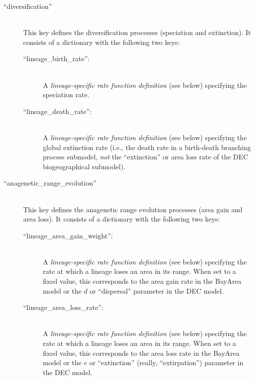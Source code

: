 \documentclass[11pt,openany]{memoir} %
\begin{document}
\begin{description}
    \item[``diversification'']  \hfill \\
        This key defines the diversification processes (speciation and extinction).
        It consists of a dictionary with the following two keys:
        \begin{description}
            \item[``lineage\_birth\_rate'':] \hfill \\
                A \textit{lineage-specific rate function definition} (see below) specifying the speciation rate.
            \item[``lineage\_death\_rate'':] \hfill \\
                A \textit{lineage-specific rate function definition} (see below) specifying the global extinction rate (i.e., the death rate in a birth-death branching process submodel, \textit{not} the ``extinction'' or area loss rate of the DEC biogeographical submodel).
        \end{description}

    \item[``anagenetic\_range\_evolution'']  \hfill \\
        This key defines the anagenetic range evolution processes (area gain and area loss).
        It consists of a dictionary with the following two keys:
        \begin{description}
            \item[``lineage\_area\_gain\_weight'':] \hfill \\
                A \textit{lineage-specific rate function definition} (see below) specifying the rate at which a lineage loses an area in its range.
                When set to a fixed value, this corresponds to the area gain rate in the BayArea model or the $d$ or ``dispersal'' parameter in the DEC model.
            \item[``lineage\_area\_loss\_rate'':] \hfill \\
                A \textit{lineage-specific rate function definition} (see below) specifying the rate at which a lineage loses an area in its range.
                When set to a fixed value, this corresponds to the area loss rate in the BayArea model or the $e$ or ``extinction'' (really, ``extirpation'') parameter in the DEC model.
        \end{description}


\end{description}
\end{document}
